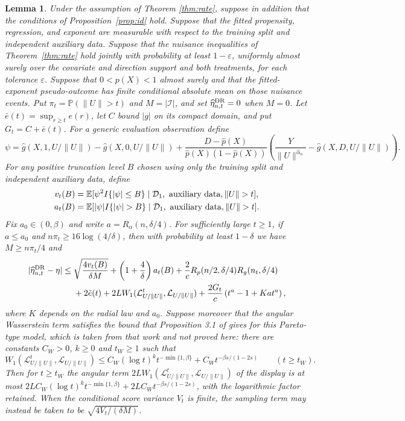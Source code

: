 \documentclass[12pt]{article}
\theoremstyle{plain}
\newtheorem{lemma}[theorem]{Lemma}
\theoremstyle{definition}
\begin{document}
\begin{lemma}
  \label{lemma:eta_rate} Under the assumption of Theorem \ref{thm:rate}, suppose in addition that the conditions of Proposition~\ref{prop:id} hold. Suppose that the fitted propensity, regression, and exponent are measurable with respect to the training split and independent auxiliary data. Suppose that the nuisance inequalities of Theorem~\ref{thm:rate} hold jointly with probability at least $1-\varepsilon$, uniformly almost surely over the covariate and direction support and both treatments, for each tolerance $\varepsilon$. Suppose that $0<p(X)<1$ almost surely and that the fitted-exponent pseudo-outcome has finite conditional absolute mean on those nuisance events. Put $\pi_t=\mathbb P(\|U\|>t)$ and $M=|\mathcal I|$, and set $\widehat\eta_{n,t}^{\operatorname{DR}}=0$ when $M=0$. Let $\bar e(t)=\sup_{r\geq t}e(r)$, let $C$ bound $|g|$ on its compact domain, and put $G_t=C+\bar e(t)$. For a generic evaluation observation define 
\[
\psi=\hat g(X,1,U/\|U\|)-\hat g(X,0,U/\|U\|)+\frac{D-\hat p(X)}{\hat p(X)(1-\hat p(X))}\left(\frac{Y}{\|U\|^{\hat\alpha_n}}-\hat g(X,D,U/\|U\|)\right).
\]
 For any positive truncation level $B$ chosen using only the training split and independent auxiliary data, define 
\[
\begin{aligned} v_t(B)&=\mathbb E[\psi^2 I\{|\psi|\leq B\}\mid\mathcal D_1,\hbox{ auxiliary data},\|U\|>t],\\ a_t(B)&=\mathbb E[|\psi|I\{|\psi|>B\}\mid\mathcal D_1,\hbox{ auxiliary data},\|U\|>t]. \end{aligned}
\]
 Fix $a_0\in(0,\beta)$ and write $a=R_\alpha(n,\delta/4)$. For sufficiently large $t\geq1$, if $a\leq a_0$ and $n\pi_t\geq16\log(4/\delta)$, then with probability at least $1-\delta$ we have $M\geq n\pi_t/4$ and \begin{align*} |\widehat\eta_{n,t}^{\operatorname{DR}}-\eta|\leq{}&\sqrt{\frac{4v_t(B)}{\delta M}}+\left(1+\frac4\delta\right)a_t(B)+\frac2c R_p(n/2,\delta/4)R_g(n_t,\delta/4)\\ &+2\bar e(t)+2L W_1(\mathcal L_{U/\|U\|}^t,\mathcal L_{U/\|U\|})+\frac{2G_t}{c}\left(t^a-1+K a t^a\right), \end{align*} where $K$ depends on the radial law and $a_0$. Suppose moreover that the angular Wasserstein term satisfies the bound that Proposition 3.1 of \citet{zhang2023wasserstein} gives for this Pareto-type model, which is taken from that work and not proved here: there are constants $C_W>0$, $k\geq0$ and $t_W\geq1$ such that 
\[
W_1(\mathcal L_{U/\|U\|}^t,\mathcal L_{U/\|U\|})\leq C_W(\log t)^k t^{-\min\{1,\beta\}}+C_W t^{-\beta s/(1-2s)}\qquad(t\geq t_W).
\]
 Then for $t\geq t_W$ the angular term $2L W_1(\mathcal L_{U/\|U\|}^t,\mathcal L_{U/\|U\|})$ of the display is at most $2LC_W(\log t)^k t^{-\min\{1,\beta\}}+2LC_W t^{-\beta s/(1-2s)}$, with the logarithmic factor retained. When the conditional score variance $V_t$ is finite, the sampling term may instead be taken to be $\sqrt{4V_t/(\delta M)}$.
\end{lemma}
\end{document}
